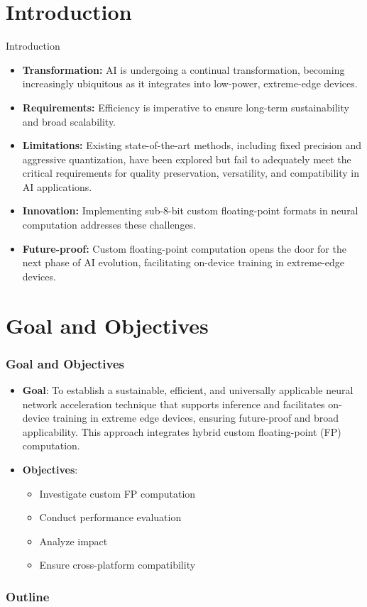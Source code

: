 \section*{Introduction}
\begin{frame}{Introduction}
	\begin{itemize}
		\item<1-> \textbf{Transformation:} AI is undergoing a continual transformation, becoming increasingly ubiquitous as it integrates into low-power, extreme-edge devices.
		\item<2-> \textbf{Requirements:} Efficiency is imperative to ensure long-term sustainability and broad scalability.
		\item<3-> \textbf{Limitations:} Existing state-of-the-art methods, including fixed precision and aggressive quantization, have been explored but fail to adequately meet the critical requirements for quality preservation, versatility, and compatibility in AI applications.
		\item<4-> \textbf{Innovation:} Implementing sub-8-bit custom floating-point formats in neural computation addresses these challenges.
	\item<5-> \textbf{Future-proof:} Custom floating-point computation opens the door for the next phase of AI evolution, facilitating on-device training in extreme-edge devices.
	\end{itemize}
\end{frame}
	
	\section*{Goal and Objectives}
	\begin{frame}
		\frametitle{Goal and Objectives}
		\begin{itemize}
			\item<1-> \textbf{Goal}:
			To establish a sustainable, efficient, and universally applicable neural network acceleration technique that supports inference and facilitates on-device training in extreme edge devices, ensuring future-proof and broad applicability. This approach integrates hybrid custom floating-point (FP) computation.
			
			\vspace{10mm} 
			
			\item<2-> \textbf{Objectives}:
			\begin{itemize}
				\item<3-> Investigate custom FP computation
				\item<4-> Conduct performance evaluation
				\item<5-> Analyze impact
				\item<6-> Ensure cross-platform compatibility
			\end{itemize}
		\end{itemize}
	\end{frame}

	\begin{frame}
	\frametitle{Outline}
	\tableofcontents %
	\end{frame}